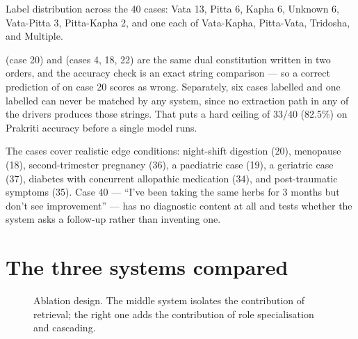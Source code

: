 Label distribution across the 40 cases: Vata 13, Pitta 6, Kapha 6, Unknown 6, Vata-Pitta 3, Pitta-Kapha 2, and one each of Vata-Kapha, Pitta-Vata, Tridosha, and Multiple.

\begin{warn}[title={Two label problems worth fixing before publishing numbers}]
 (case 20) and  (cases 4, 18, 22) are the same dual constitution written in two orders, and the accuracy check is an exact string comparison --- so a correct prediction of  on case 20 scores as wrong. Separately, six cases labelled  and one labelled  can never be matched by any system, since no extraction path in any of the drivers produces those strings. That puts a hard ceiling of 33/40 (82.5\%) on Prakriti accuracy before a single model runs.
\end{warn}

The cases cover realistic edge conditions: night-shift digestion (20), menopause (18), second-trimester pregnancy (36), a paediatric case (19), a geriatric case (37), diabetes with concurrent allopathic medication (34), and post-traumatic symptoms (35). Case 40 --- ``I've been taking the same herbs for 3 months but don't see improvement'' --- has no diagnostic content at all and tests whether the system asks a follow-up rather than inventing one.

\section{The three systems compared}

\begin{figure}[H]
\centering
{}
\caption{Ablation design. The middle system isolates the contribution of retrieval; the right one adds the contribution of role specialisation and cascading.}
\end{figure}

